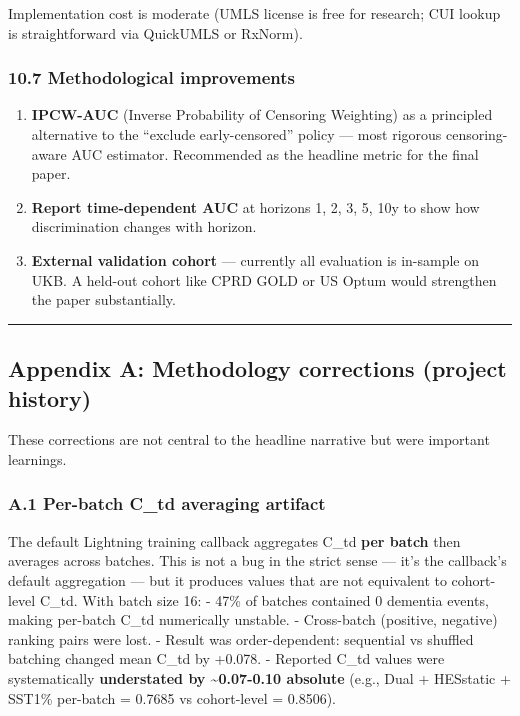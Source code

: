 \documentclass[
  11pt,
]{article}
\providecommand{\tightlist}{%
  \setlength{\itemsep}{0pt}\setlength{\parskip}{0pt}}
\begin{document}
Implementation cost is moderate (UMLS license is free for research; CUI
lookup is straightforward via QuickUMLS or RxNorm).

\subsubsection{10.7 Methodological
improvements}\label{methodological-improvements}

\begin{enumerate}
\def\labelenumi{\arabic{enumi}.}
\tightlist
\item
  \textbf{IPCW-AUC} (Inverse Probability of Censoring Weighting) as a
  principled alternative to the ``exclude early-censored'' policy ---
  most rigorous censoring-aware AUC estimator. Recommended as the
  headline metric for the final paper.
\item
  \textbf{Report time-dependent AUC} at horizons 1, 2, 3, 5, 10y to show
  how discrimination changes with horizon.
\item
  \textbf{External validation cohort} --- currently all evaluation is
  in-sample on UKB. A held-out cohort like CPRD GOLD or US Optum would
  strengthen the paper substantially.
\end{enumerate}

\begin{center}\rule{0.5\linewidth}{0.5pt}\end{center}

\subsection{Appendix A: Methodology corrections (project
history)}\label{appendix-a-methodology-corrections-project-history}

These corrections are not central to the headline narrative but were
important learnings.

\subsubsection{A.1 Per-batch C\_td averaging
artifact}\label{a.1-per-batch-c_td-averaging-artifact}

The default Lightning training callback aggregates C\_td \textbf{per
batch} then averages across batches. This is not a bug in the strict
sense --- it's the callback's default aggregation --- but it produces
values that are not equivalent to cohort-level C\_td. With batch size
16: - 47\% of batches contained 0 dementia events, making per-batch
C\_td numerically unstable. - Cross-batch (positive, negative) ranking
pairs were lost. - Result was order-dependent: sequential vs shuffled
batching changed mean C\_td by +0.078. - Reported C\_td values were
systematically \textbf{understated by \textasciitilde0.07-0.10 absolute}
(e.g., Dual + HESstatic + SST1\% per-batch = 0.7685 vs cohort-level =
0.8506).
\end{document}
